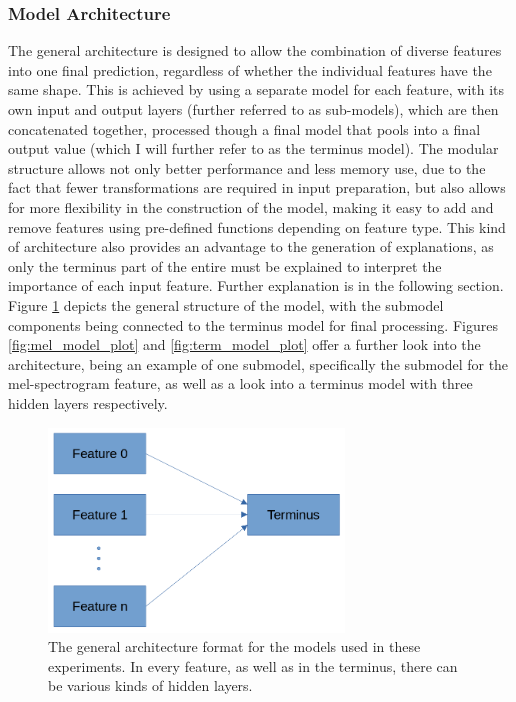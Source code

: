 \documentclass{article}
\begin{document}
			\subsubsection{Model Architecture}
			The general architecture is designed to allow the combination of diverse features into
			one final prediction, regardless of whether the individual features have the same
			shape. This is achieved by using a separate model for each feature, with its own input
			and output layers (further referred to as sub-models), which are then concatenated
			together, processed though a final model that pools into a final output value (which I
			will further refer to as the terminus model). The modular structure allows not only
			better performance and less memory use, due to the fact that fewer transformations are
			required in input preparation, but also allows for more flexibility in the
			construction of the model, making it easy to add and remove features using pre-defined
			functions depending on feature type. This kind of architecture also provides an
			advantage to the generation of explanations, as only the terminus part of the entire
			must be explained to interpret the importance of each input feature. Further
			explanation is in the following section. Figure \ref{fig:model_plot} depicts the
			general structure of the model, with the submodel components being connected to the
			terminus model for final processing. Figures \ref{fig:mel_model_plot} and
			\ref{fig:term_model_plot} offer a further look into the architecture, being an example
			of one submodel, specifically the submodel for the mel-spectrogram feature, as well as
			a look into a terminus model with three hidden layers respectively.
			\begin{figure}[htbp]
				\begin{center}
					\includegraphics[width=0.7\textwidth]{images/model_fig.png}
					\caption{The general architecture format for the models used in these
					experiments. In every feature, as well as in the terminus, there can be
					various kinds of hidden layers.}
					\label{fig:model_plot}
				\end{center}
			\end{figure}
\end{document}
